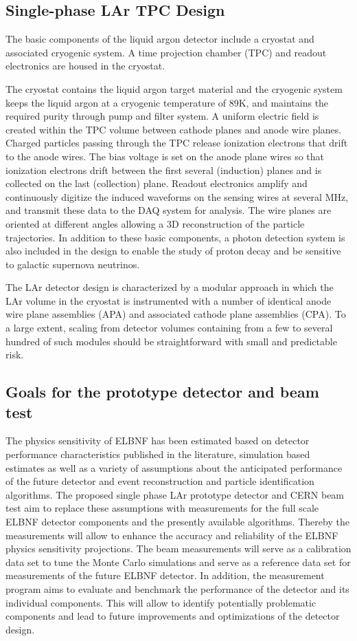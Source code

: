 \subsection{Single-phase LAr TPC Design}

The basic components of the liquid argon detector include a cryostat and associated cryogenic system. A time projection chamber (TPC) and readout electronics are housed in the cryostat.

The cryostat contains the liquid argon target material and the cryogenic system keeps the liquid argon at a cryogenic temperature of 89K, and maintains the required purity through pump and filter system. A uniform electric field is created within the TPC volume between cathode planes and anode wire planes. Charged particles passing through the TPC release ionization electrons that drift to the anode wires. The bias voltage is set on the anode plane wires so that ionization electrons drift between the first several (induction) planes and is collected on the last (collection) plane. Readout electronics amplify and continuously digitize the induced waveforms on the sensing wires at several MHz, and transmit these data to the DAQ system for analysis. The wire planes are oriented at different angles allowing a 3D reconstruction of the particle trajectories. In addition to these basic components, a photon detection system is also included in the design to enable the study of proton decay and be sensitive to galactic supernova neutrinos.

The LAr detector design is characterized by a modular approach in which the LAr volume in the cryostat is instrumented with a number of identical anode wire plane assemblies (APA) and associated cathode plane assemblies (CPA). To a large extent, scaling from detector volumes containing from a few to several hundred of such modules should be straightforward with small and predictable risk.


\subsection{Goals for the prototype detector and beam test}

The physics sensitivity of ELBNF has been estimated based on detector performance characteristics published in the literature, simulation based estimates
as well as a variety of assumptions about the anticipated performance of the future detector and event reconstruction and particle identification algorithms.
The proposed single phase LAr prototype detector and CERN beam test aim to replace these assumptions with measurements for the full scale ELBNF detector 
components and the presently available algorithms. Thereby the measurements will allow to enhance the accuracy and reliability of the ELBNF physics sensitivity 
projections. The beam measurements will serve as a calibration data set to tune the Monte Carlo simulations and serve as a reference data set for measurements of the 
future ELBNF detector. In addition, the measurement program aims to evaluate and benchmark the performance of the detector and its individual components.
This will allow to identify potentially problematic components and lead to future improvements and optimizations of the detector design.

